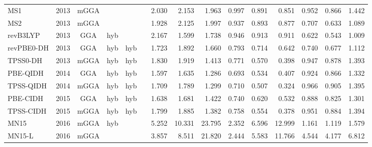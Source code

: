 \begin{landscape}
\begin{longtable}{lcccccrrrrrrrrr}
    MS1              & 2013 & mGGA &          &             &           & 2.030             & 2.153             & 1.963  & 0.997              & 0.891             & 0.851  & 0.952   & 0.866 & 1.442 \\
    MS2              & 2013 & mGGA &          &             &           & 1.928             & 2.125             & 1.997  & 0.937              & 0.893             & 0.877  & 0.707   & 0.633 & 1.089 \\
    revB3LYP         & 2013 & GGA  & hyb      &             &           & 2.167             & 1.599             & 1.738  & 0.946              & 0.913             & 0.911  & 0.622   & 0.543 & 1.009 \\
    revPBE0-DH       & 2013 & GGA  & hyb      & hyb         &           & 1.723             & 1.892             & 1.660  & 0.793              & 0.714             & 0.642  & 0.740   & 0.677 & 1.112 \\
    TPSS0-DH         & 2013 & mGGA & hyb      & hyb         &           & 1.830             & 1.919             & 1.413  & 0.771              & 0.570             & 0.398  & 0.947   & 0.878 & 1.393 \\
    PBE-QIDH         & 2014 & GGA  & hyb      & hyb         &           & 1.597             & 1.635             & 1.286  & 0.693              & 0.534             & 0.407  & 0.924   & 0.866 & 1.332 \\
    TPSS-QIDH        & 2014 & mGGA & hyb      & hyb         &           & 1.709             & 1.789             & 1.299  & 0.710              & 0.507             & 0.324  & 0.966   & 0.905 & 1.395 \\
    PBE-CIDH         & 2015 & GGA  & hyb      & hyb         &           & 1.638             & 1.681             & 1.422  & 0.740              & 0.620             & 0.532  & 0.888   & 0.825 & 1.301 \\
    TPSS-CIDH        & 2015 & mGGA & hyb      & hyb         &           & 1.799             & 1.885             & 1.382  & 0.758              & 0.554             & 0.378  & 0.951   & 0.884 & 1.394 \\
    MN15             & 2016 & mGGA & hyb      &             &           & 5.252             & 10.331            & 23.795 & 2.352              & 6.596             & 12.999 & 1.161   & 1.119 & 1.579 \\
    MN15-L           & 2016 & mGGA &          &             &           & 3.857             & 8.511             & 21.820 & 2.444              & 5.583             & 11.766 & 4.544   & 4.177 & 6.812 \\

\end{longtable}
\end{landscape}
